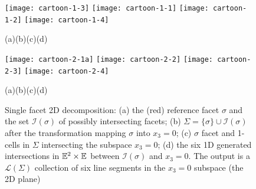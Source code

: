 \begin{figure}[htbp] %
   \centering
\texttt{[image: cartoon-1-3]}\hfill%
\texttt{[image: cartoon-1-1]}\hfill%
\texttt{[image: cartoon-1-2]}\hfill%
\texttt{[image: cartoon-1-4]}\hfill%

\vspace{-1.5mm}
{\footnotesize\hspace{.12\textwidth}(a)\hfill(b)\hfill(c)\hfill(d)\hspace{.12\textwidth}}
\vspace{-3.5mm}
   \caption{ Input of two 3D cellular complexes $\{X^1_3, X^2_3\}$ in $\E^3$: 
   (a) LAR input data: V := vertices; CV := 3-cells; FV := 2-cells; 
   (b) rotated and translated unit cubes {$\mathcal{S}_3 = \{\, X^h_3,\, h\in \{1,2\}\,\}$} in $\E^3$; 
   (c) the (exploded) set of 2-complexes $B = \bigcup_{h\in\{1,2\}} X^h_2$. Note that the 2-cells in 3-space have no orientation; 
   (d) image of the (exploded) spatial index over 2-cells, using {(yellow)} {3D containment boxes} \& three 1D interval trees {(not included in the image)}. \label{fig:cartoon-1} }
   
   
   
   \vspace{3mm}

\texttt{[image: cartoon-2-1a]}\hfill%
\texttt{[image: cartoon-2-2]}\hfill%
\texttt{[image: cartoon-2-3]}\hfill%
\texttt{[image: cartoon-2-4]}%

\vspace{-1.5mm}
{\footnotesize\hspace{.12\textwidth}(a)\hfill(b)\hfill(c)\hfill{(d)}\hspace{.12\textwidth}}
\vspace{-3.5mm}
   \caption{ Single facet 2D decomposition: 
   (a) the (red) reference facet $\sigma$ and the set $\mathcal{I}(\sigma)$ of possibly intersecting facets; 
   (b) $\Sigma = \{\sigma\}\cup\mathcal{I}(\sigma)$ after the transformation mapping $\sigma$ into $x_3=0$; 
   (c) $\sigma$ facet and 1-cells in $\Sigma$ intersecting the subspace $x_3 =0$; 
   (d) the six 1D generated intersections in $\mathbb{E}^2\times \mathbb{E}$ between $\mathcal{I}(\sigma)$ and $x_3=0$. The output is a $\mathcal{L}({\Sigma})$ collection of {six} line segments in the {$x_3=0$ subspace (the 2D plane)}
   \label{fig:cartoon-2} }


\end{figure}
